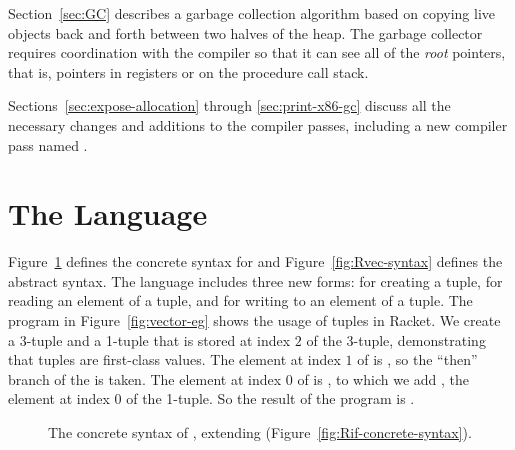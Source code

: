 \documentclass[11pt]{book}
\newcommand{\gray}[1]{{\color{gray} #1}}
\begin{document}
Section~\ref{sec:GC} describes a garbage collection algorithm based on
copying live objects back and forth between two halves of the
heap. The garbage collector requires coordination with the compiler so
that it can see all of the \emph{root} pointers, that is, pointers in
registers or on the procedure call stack.

Sections~\ref{sec:expose-allocation} through \ref{sec:print-x86-gc}
discuss all the necessary changes and additions to the compiler
passes, including a new compiler pass named .

\section{The \LangVec{} Language}
\label{sec:r3}

Figure~\ref{fig:Rvec-concrete-syntax} defines the concrete syntax for
\LangVec{} and Figure~\ref{fig:Rvec-syntax} defines the abstract syntax.  The
\LangVec{} language includes three new forms:  for creating a
tuple,  for reading an element of a tuple, and
 for writing to an element of a tuple. The program
in Figure~\ref{fig:vector-eg} shows the usage of tuples in Racket. We
create a 3-tuple  and a 1-tuple that is stored at index $2$ of
the 3-tuple, demonstrating that tuples are first-class values.  The
element at index $1$ of  is , so the ``then'' branch
of the  is taken.  The element at index $0$ of  is
, to which we add , the element at index $0$ of the
1-tuple. So the result of the program is .

\begin{figure}[tbp]
\centering
\fbox{
\begin{minipage}{0.96\textwidth}
\[
\begin{array}{lcl}
  \Type &::=& \gray{\key{Integer} \mid \key{Boolean}}
  \mid \LP\key{Vector}\;\Type\ldots\RP \mid \key{Void}\\
  \Exp &::=& \gray{  \Int \mid \CREAD{} \mid \CNEG{\Exp} \mid \CADD{\Exp}{\Exp} \mid \CSUB{\Exp}{\Exp} }  \\
  &\mid&  \gray{  \Var \mid \CLET{\Var}{\Exp}{\Exp}  }\\
  &\mid& \gray{ \key{\#t} \mid \key{\#f} 
   \mid \LP\key{and}\;\Exp\;\Exp\RP 
   \mid \LP\key{or}\;\Exp\;\Exp\RP
   \mid \LP\key{not}\;\Exp\RP } \\
  &\mid& \gray{  \LP\itm{cmp}\;\Exp\;\Exp\RP 
   \mid \CIF{\Exp}{\Exp}{\Exp}  } \\
  &\mid& \LP\key{vector}\;\Exp\ldots\RP 
   \mid \LP\key{vector-length}\;\Exp\RP \\
  &\mid& \LP\key{vector-ref}\;\Exp\;\Int\RP
   \mid \LP\key{vector-set!}\;\Exp\;\Int\;\Exp\RP \\
  &\mid& \LP\key{void}\RP \mid \LP\key{has-type}~\Exp~\Type\RP\\
  \LangVec{} &::=& \Exp
\end{array}
\]
\end{minipage}
}
\caption{The concrete syntax of \LangVec{}, extending \LangIf{}
  (Figure~\ref{fig:Rif-concrete-syntax}).}
\label{fig:Rvec-concrete-syntax}
\end{figure}
\end{document}
